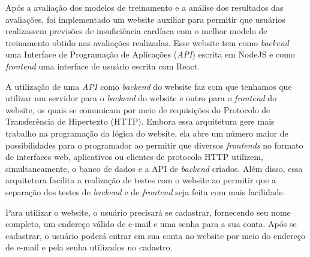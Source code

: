 Após a avaliação dos modelos de treinamento e a análise dos resultados das avaliações, foi implementado um website auxiliar para permitir que usuários realizassem previsões de insuficiência cardíaca com o melhor modelo de treinamento obtido nas avaliações realizadas. Esse website tem como \textit{backend} uma Interface de Programação de Aplicações (\textit{API}) escrita em NodeJS e como \textit{frontend} uma interface de usuário escrita com React.

A utilização de uma \textit{API} como \textit{backend} do website faz com que tenhamos que utilizar um servidor para o \textit{backend} do website e outro para o \textit{frontend} do website, os quais se comunicam por meio de requisições do Protocolo de Transferência de Hipertexto (HTTP). Embora essa arquitetura gere mais trabalho na programação da lógica do website, ela abre um número maior de possibilidades para o programador ao permitir que diversos \textit{frontends} no formato de interfaces web, aplicativos ou clientes de protocolo HTTP utilizem, simultaneamente, o banco de dados e a API de \textit{backend} criados. Além disso, essa arquitetura facilita a realização de testes com o website ao permitir que a separação dos testes de \textit{backend} e de \textit{frontend} seja feita com mais facilidade.

Para utilizar o website, o usuário precisará se cadastrar, fornecendo seu nome completo, um endereço válido de e-mail e uma senha para a sua conta. Após se cadastrar, o usuário poderá entrar em sua conta no website por meio do endereço de e-mail e pela senha utilizados no cadastro.




